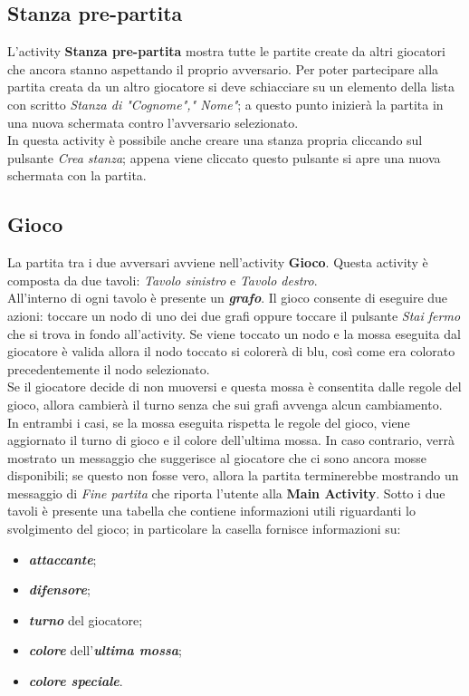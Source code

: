 \documentclass[a4paper,12pt,twoside,openright]{report}
\begin{document}
\subsection{Stanza pre-partita}
L'activity \textbf{Stanza pre-partita} mostra tutte le partite create da altri giocatori che ancora stanno aspettando il proprio avversario. Per poter partecipare alla partita creata da un altro
giocatore si deve schiacciare su un elemento della lista con scritto \textit{Stanza di "Cognome"," Nome"}; a questo punto inizierà la partita in una nuova schermata contro l'avversario selezionato.\\
In questa activity è possibile anche creare una stanza propria cliccando sul pulsante \textit{Crea stanza}; appena viene cliccato questo pulsante si apre una nuova schermata con la partita.

\subsection{Gioco}
La partita tra i due avversari avviene nell'activity \textbf{Gioco}. Questa activity è composta da due tavoli: \textit{Tavolo sinistro} e \textit{Tavolo destro}.\\
All'interno di ogni tavolo è presente un \textbf{\textit{grafo}}. Il gioco consente di eseguire due azioni: toccare un nodo di uno dei due grafi oppure toccare il pulsante \textit{Stai fermo} che si trova
in fondo all'activity. Se viene toccato un nodo e la mossa eseguita dal giocatore è valida allora il nodo toccato si colorerà di blu, così come era colorato precedentemente il nodo selezionato.\\
Se il giocatore decide di non muoversi e questa mossa è consentita dalle regole del gioco, allora cambierà il turno senza che sui grafi avvenga alcun cambiamento.\\
In entrambi i casi, se la mossa eseguita rispetta le regole del gioco, viene aggiornato il turno di gioco e il colore dell'ultima mossa. In caso contrario, verrà mostrato un messaggio che suggerisce
al giocatore che ci sono ancora mosse disponibili; se questo non fosse vero, allora la partita terminerebbe mostrando un messaggio di \textit{Fine partita} che riporta l'utente alla \textbf{Main Activity}.
Sotto i due tavoli è presente una tabella che contiene informazioni utili riguardanti lo svolgimento del gioco; in particolare la casella fornisce informazioni su:

\begin{itemize}
\item \textbf\textit{attaccante};

\item \textbf\textit{difensore};

\item \textbf\textit{turno} del giocatore;

\item \textbf\textit{colore} dell'\textbf\textit{ultima mossa};

\item \textbf\textit{colore speciale}.
\end{itemize}
\end{document}
